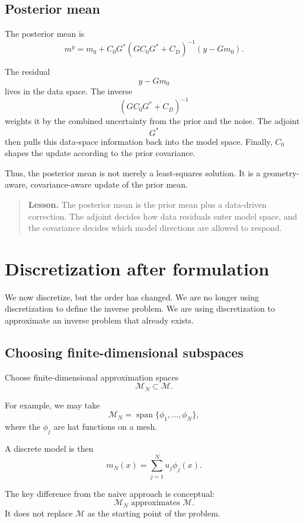 \documentclass[11pt,a4paper]{book}
\newenvironment{lesson}
  {\begin{quote}\textbf{Lesson.}}
  {\end{quote}}
\newcommand{\M}{\mathcal{M}}      %
\newcommand{\obs}{y}
\newcommand{\G}{G}
\newcommand{\Gadj}{G^\ast}
\begin{document}
\subsection{Posterior mean}

The posterior mean is
\[
    m^y
    =
    m_0
    +
    C_0 \Gadj
    \left(
        \G C_0 \Gadj + C_D
    \right)^{-1}
    \left(
        \obs - \G m_0
    \right).
\]

The residual
\[
    \obs-\G m_0
\]
lives in the data space. The inverse
\[
    \left(
        \G C_0 \Gadj + C_D
    \right)^{-1}
\]
weights it by the combined uncertainty from the prior and the noise. The
adjoint
\[
    \Gadj
\]
then pulls this data-space information back into the model space. Finally,
$C_0$ shapes the update according to the prior covariance.

Thus, the posterior mean is not merely a least-squares solution. It is a
geometry-aware, covariance-aware update of the prior mean.

\begin{lesson}
The posterior mean is the prior mean plus a data-driven correction. The adjoint
decides how data residuals enter model space, and the covariance decides which
model directions are allowed to respond.
\end{lesson}

\section{Discretization after formulation}

We now discretize, but the order has changed. We are no longer using
discretization to define the inverse problem. We are using discretization to
approximate an inverse problem that already exists.

\subsection{Choosing finite-dimensional subspaces}

Choose finite-dimensional approximation spaces
\[
    \M_N \subset \M.
\]

For example, we may take
\[
    \M_N
    =
    \operatorname{span}\{\phi_1,\ldots,\phi_N\},
\]
where the $\phi_j$ are hat functions on a mesh.

A discrete model is then
\[
    m_N(x)
    =
    \sum_{j=1}^N u_j\phi_j(x).
\]

The key difference from the naive approach is conceptual:
\[
    \M_N
    \text{ approximates }
    \M.
\]
It does not replace $\M$ as the starting point of the problem.
\end{document}
